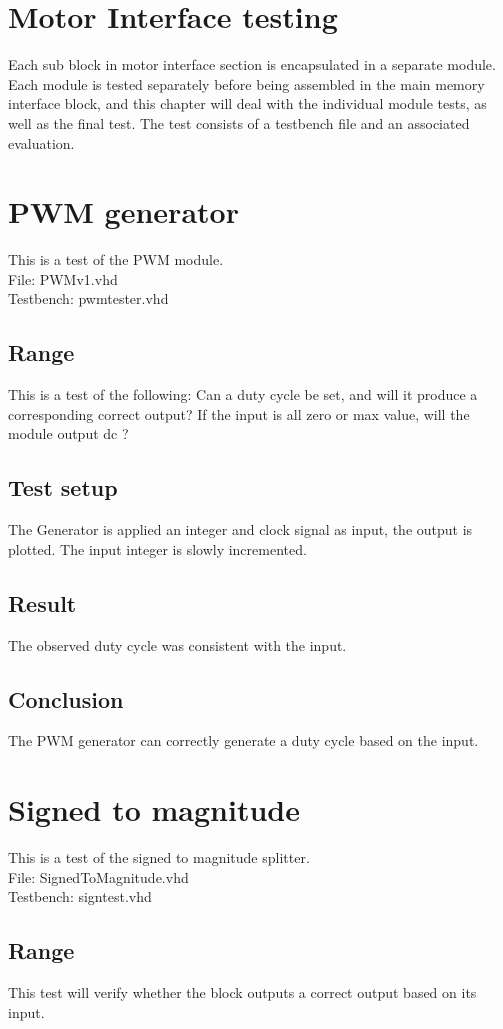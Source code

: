 \section{Motor Interface testing} \label{sec:llctest}
Each sub block in motor interface section is encapsulated in a separate module.
Each module is tested separately before being assembled in the main memory interface block, and this chapter will deal with the individual module tests, as well as the final test.
The test consists of a testbench file and an associated evaluation.

\section{PWM generator}
This is a test of the PWM module.\\
File: PWMv1.vhd\\
Testbench: pwmtester.vhd
\subsection{Range}
This is a test of the following: Can a duty cycle be set, and will it produce a corresponding correct output?
If the input is all zero or max value, will the module output dc ?
\subsection{Test setup}
The Generator is applied an integer and clock signal as input, the output is plotted. The input integer is slowly incremented.
\subsection{Result}
The observed duty cycle was consistent with the input.
\subsection{Conclusion}
The PWM generator can correctly generate a duty cycle based on the input.



\section{Signed to magnitude}
This is a test of the signed to magnitude splitter.\\
File: SignedToMagnitude.vhd\\
Testbench: signtest.vhd

\subsection{Range}
This test will verify whether the block outputs a correct output based on its input.
